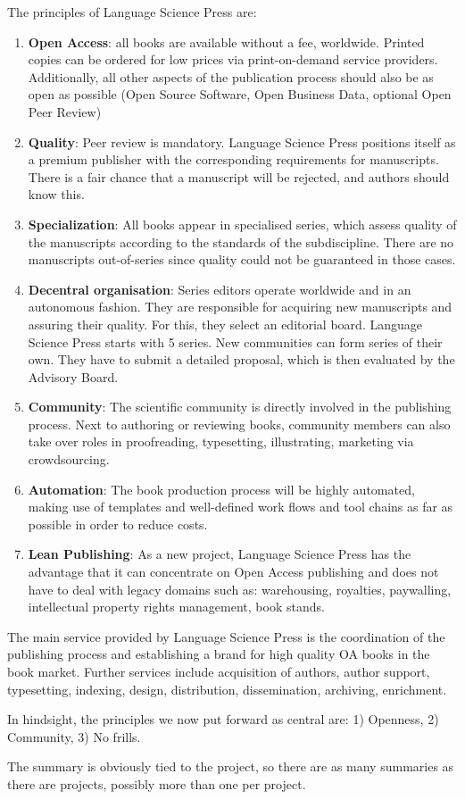\documentclass[nonflat,smallfont
]{langsci/langscibook}
\newcommand{\evaluation}[1]{
  \renewcommand{\tblslinecolour}{lsLightOrange}
  \tblssy{receipt}{Evaluation}{\vspace*{-5mm}#1}
}
\newcommand{\othersolutions}[1]{
  \renewcommand{\tblslinecolour}{lsDarkGreenOne}
  \tblssy{more}{Other solutions}{\vspace*{-5mm}#1}
}
\renewcommand{\tblssy}[4][black!12]{%
  \renewcommand{\langscisymbol}{#2}\renewcommand{\tblsboxcolor}{#1}
  \begin{mdframed}[style=yellowexercise,frametitle={#3}]
    #4
  \end{mdframed}
}
\begin{document}
{The principles of Language Science Press are: 
\begin{enumerate}
\sloppy
 \item \textbf{Open Access}: all books are available without a fee, worldwide. Printed copies can be ordered for low prices via print-on-demand service providers. Additionally, all other aspects of the publication process should also be as open as possible (Open Source Software, Open Business Data, optional Open Peer Review)
 \item \textbf{Quality}: Peer review is mandatory. Language Science Press positions itself as a premium publisher with the corresponding requirements for manuscripts. There is a fair chance that a manuscript will be rejected, and authors should know this. 
 \item \textbf{Specialization}: All books appear in specialised series, which assess quality of the manuscripts according to the standards of the subdiscipline. There are no manuscripts out-of-series since quality could not be guaranteed in those cases. 
 \item \textbf{Decentral organisation}: Series editors operate worldwide and in an autonomous fashion. They are responsible for acquiring new manuscripts and assuring their quality. For this, they select an editorial board. Language Science Press starts with 5 series. New communities can form series of their own. They have to submit a detailed proposal, which is then evaluated by the Advisory Board. 
 \item \textbf{Community}: The scientific community is directly involved in the publishing process. Next to authoring or reviewing books, community members can also take over roles in proofreading, typesetting, illustrating, marketing via crowdsourcing. 
 \item \textbf{Automation}: The book production process will be highly automated, making use of templates and well-defined work flows and tool chains as far as possible in order to reduce costs.  
 \item \textbf{Lean Publishing}: As a new project, Language Science Press has the advantage that it can concentrate on Open Access publishing and does not have to deal with legacy domains such as: warehousing, royalties, paywalling, intellectual property rights management, book stands. 
\end{enumerate}

The main service provided by Language Science Press is the coordination of the publishing process and establishing a brand for high quality OA books in the book market. Further services include acquisition of authors, author support, typesetting, indexing, design, distribution, dissemination, archiving, enrichment. 
}
\evaluation{In hindsight, the principles we now put forward as central are: 1) Openness, 2) Community, 3) No frills.}
\othersolutions{The summary is obviously tied to the project, so there are as many summaries as there are projects, possibly more than one per project. 
}
\end{document}
